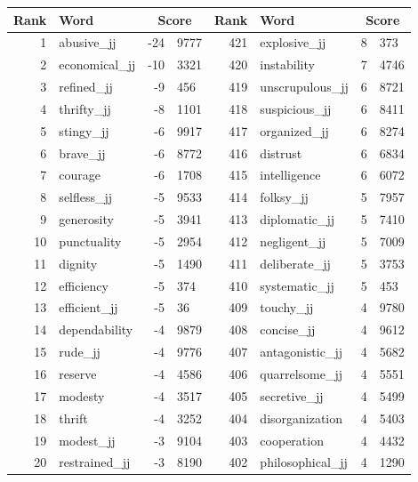 \begin{table}[tbp]
    \begin{tabular}{| rlr@{.}l | rlr@{.}l |}
    \hline
    \textbf{Rank} & \textbf{Word} & \multicolumn{2}{c|}{\textbf{Score}} & \textbf{Rank} & \textbf{Word} & \multicolumn{2}{c|}{\textbf{Score}} \\
    \hline
    1 & abusive\_jj & -24 & 9777    &    421 & explosive\_jj & 8 & 373 \\
    2 & economical\_jj & -10 & 3321    &    420 & instability & 7 & 4746 \\
    3 & refined\_jj & -9 & 456    &    419 & unscrupulous\_jj & 6 & 8721 \\
    4 & thrifty\_jj & -8 & 1101    &    418 & suspicious\_jj & 6 & 8411 \\
    5 & stingy\_jj & -6 & 9917    &    417 & organized\_jj & 6 & 8274 \\
    6 & brave\_jj & -6 & 8772    &    416 & distrust & 6 & 6834 \\
    7 & courage & -6 & 1708    &    415 & intelligence & 6 & 6072 \\
    8 & selfless\_jj & -5 & 9533    &    414 & folksy\_jj & 5 & 7957 \\
    9 & generosity & -5 & 3941    &    413 & diplomatic\_jj & 5 & 7410 \\
    10 & punctuality & -5 & 2954    &    412 & negligent\_jj & 5 & 7009 \\
    11 & dignity & -5 & 1490    &    411 & deliberate\_jj & 5 & 3753 \\
    12 & efficiency & -5 & 374    &    410 & systematic\_jj & 5 & 453 \\
    13 & efficient\_jj & -5 & 36    &    409 & touchy\_jj & 4 & 9780 \\
    14 & dependability & -4 & 9879    &    408 & concise\_jj & 4 & 9612 \\
    15 & rude\_jj & -4 & 9776    &    407 & antagonistic\_jj & 4 & 5682 \\
    16 & reserve & -4 & 4586    &    406 & quarrelsome\_jj & 4 & 5551 \\
    17 & modesty & -4 & 3517    &    405 & secretive\_jj & 4 & 5499 \\
    18 & thrift & -4 & 3252    &    404 & disorganization & 4 & 5403 \\
    19 & modest\_jj & -3 & 9104    &    403 & cooperation & 4 & 4432 \\
    20 & restrained\_jj & -3 & 8190    &    402 & philosophical\_jj & 4 & 1290 \\

\end{tabular}
\end{table}
